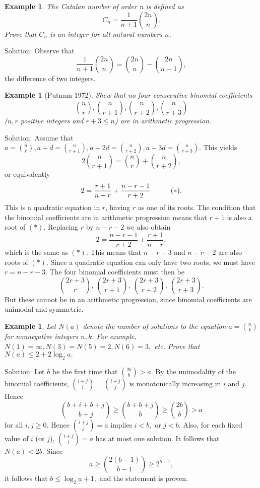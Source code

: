 \documentclass[11pt, openany]{book}
\theoremstyle{change} \theoremheaderfont{\blue\sffamily\bfseries}
\newtheorem{exa}[thm]{Example}
\theoremstyle{nonumberplain} \theoremheaderfont{\sffamily\bfseries}
\def\binom#1#2{{#1\choose#2}}
\newcommand{\í}{\'{\i}}
\begin{document}
\begin{exa} The {\em Catalan number of order n} is defined as $$
C_n = \frac{1}{n + 1}\binom{2n}{n}.$$ Prove that $C_n$ is an
integer for all natural numbers $n$. \end{exa} Solution: Observe
that $$ \frac{1}{n + 1}\binom{2n}{n} = \binom{2n}{n} -
\binom{2n}{n - 1},$$ the difference of two integers.
\begin{exa}[Putnam 1972] Shew that no four consecutive binomial
coefficients
$$ \binom{n}{r}, \binom{n}{r + 1}, \binom{n}{r + 2}, \binom{n}{r + 3}$$
($n, r$ positive integers and $r + 3 \leq n$) are in arithmetic
progression. \end{exa} Solution: Assume that $a = \binom{n}{r}, a
+ d = \binom{n}{r + 1}, a + 2d = \binom{n}{r + 2}, a + 3d =
\binom{n}{r + 3}$. This yields
$$ 2\binom{n}{r + 1} = \binom{n}{r} + \binom{n}{r + 2},$$or equivalently
$$ 2 = \frac{r + 1}{n - r} + \frac{n - r - 1}{r + 2}\hspace{10mm} (*).$$
This is a quadratic equation in $r$, having $r$ as one of its
roots. The condition that the binomial coefficients are in
arithmetic progression means that $r + 1$ is also a root of $(*)$.
Replacing $r$ by $n - r - 2$ we also obtain $$ 2 = \frac{n - r -
1}{r + 2} + \frac{r + 1}{n - r},$$which is the same as $(*).$ This
means that $n - r - 3$ and $n - r - 2$ are also roots of $(*)$.
Since a quadratic equation can only have two roots, we must have
$r = n - r - 3.$ The four binomial coefficients must then be
$$ \binom{2r + 3}{r}, \ \binom{2r + 3}{r + 1}, \ \binom{2r + 3}{r + 2}, \
\binom{2r + 3}{r + 3}.$$But these cannot be in an arithmetic
progression, since binomial coefficients are unimodal and
symmetric.
\begin{exa} Let $N(a)$ denote the number of solutions to the equation $a =
\binom{n}{k}$ for nonnegative integers $n, k$. For example, $N(1)
= \infty , N(3) = N(5) = 2, N(6) = 3,$ etc. Prove that $N(a) \leq
2 + 2\log _2 a.$ \end{exa} Solution: Let $b$ be the first time
that $\binom{2b}{b} > a$. By the unimodality of the binomial
coefficients, $\binom{i + j}{i} = \binom{i + j}{j}$ is
monotonically increasing in $i$ and $j$. Hence
$$ \binom{b + i + b + j}{b + j} \geq \binom{b + b + j}{b} \geq \binom{2b}{b}
> a$$for all $i, j \geq 0.$ Hence $\binom{i + j}{j} = a$ implies $i < b,$
or $j < b.$ Also, for each fixed value of $i$ (or $j$), $\binom{i
+ j}{i} = a$ has at most one solution. It follows that $N(a) <
2b.$ Since
$$ a \geq \binom{2(b - 1)}{b - 1} \geq 2^{b - 1},$$ it follows that $b
\leq \log _2 a + 1,$ and the statement is proven.
\end{document}
